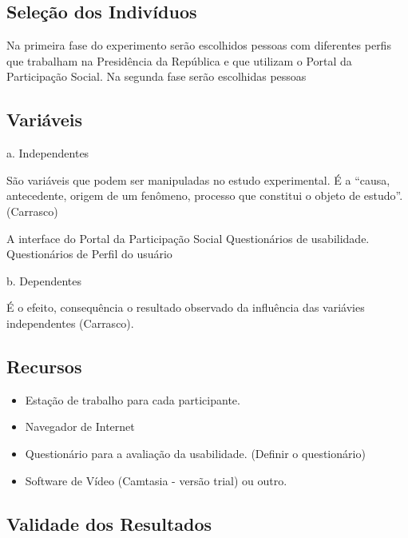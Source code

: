 \subsection{Seleção dos Indivíduos}

	Na primeira fase do experimento serão escolhidos pessoas com diferentes perfis que trabalham na Presidência da República e que utilizam o Portal da Participação Social.
Na segunda fase serão escolhidas pessoas 

\subsection{Variáveis}
 
a. Independentes

São variáveis que podem ser manipuladas no estudo experimental. É a “causa, antecedente, origem de um fenômeno, processo que constitui o objeto de estudo”.(Carrasco)


A interface do Portal da Participação Social
Questionários de usabilidade.
Questionários de Perfil do usuário


b. Dependentes

É o efeito, consequência o resultado observado da influência das variávies independentes (Carrasco).


\subsection{Recursos}

\begin{itemize}
\item Estação de trabalho para cada participante.
\item Navegador de Internet
\item Questionário para a avaliação da usabilidade. (Definir o questionário)
\item Software de Vídeo (Camtasia - versão trial) ou outro.
\end{itemize}

\subsection{Validade dos Resultados}

